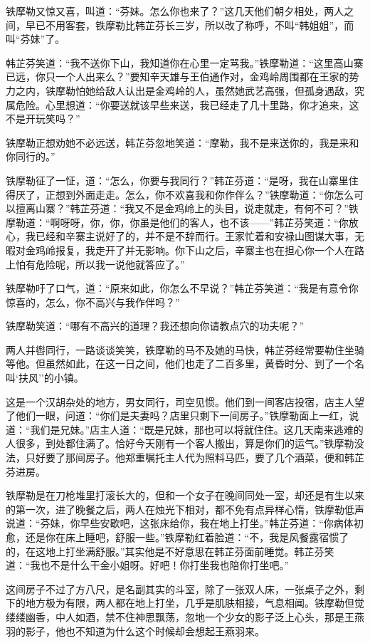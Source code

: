 \documentclass[12pt,oneside]{book}
\begin{document}
铁摩勒又惊又喜，叫道：``芬妹。怎么你也来了？''这几天他们朝夕相处，两人之间，早已不用客套，铁摩勒比韩芷芬长三岁，所以改了称呼，不叫``韩姐姐''，而叫``芬妹''了。

韩芷芬笑道：``我不送你下山，我知道你在心里一定骂我。''铁摩勒道：``这里高山寨已远，你只一个人出来么？''要知辛天雄与王伯通作对，金鸡岭周围都在王家的势力之内，铁摩勒怕她给敌人认出是金鸡岭的人，虽然她武艺高强，但孤身遇敌，究属危险。心里想道：``你要送就该早些来送，我已经走了几十里路，你才追来，这不是开玩笑吗？''

铁摩勒正想劝她不必远送，韩芷芬忽地笑道：``摩勒，我不是来送你的，我是来和你同行的。''

铁摩勒征了一怔，道：``怎么，你要与我同行？''韩芷芬道：``是呀，我在山寨里住得厌了，正想到外面走走。怎么，你不欢喜我和你作伴么？''铁摩勒道：``你怎么可以擅离山寨？''韩芷芬道：``我又不是金鸡岭上的头目，说走就走，有何不可？''铁摩勒道：``啊呀呀，你，你，你虽是他们的客人，也不该------''韩芷芬笑道：``你放心，我已经和辛寨主说好了的，并不是不辞而行。王家忙着和安禄山图谋大事，无暇对金鸡岭报复，我走开了并无影响。你下山之后，辛寨主也在担心你一个人在路上怕有危险呢，所以我一说他就答应了。''

铁摩勒吁了口气，道：``原来如此，你怎么不早说？''韩芷芬笑道：``我是有意令你惊喜的，怎么，你不高兴与我作伴吗？''

铁摩勒笑道：``哪有不高兴的道理？我还想向你请教点穴的功夫呢？''

两人并辔同行，一路谈谈笑笑，铁摩勒的马不及她的马快，韩芷芬经常要勒住坐骑等他。但虽然如此，在这一日之间，他们也走了二百多里，黄昏时分、到了一个名叫`扶风''的小镇。

这是一个汉胡杂处的地方，男女同行，司空见惯。他们到一间客店投宿，店主人望了他们一眼，问道：``你们是夫妻吗？店里只剩下一间房子。''铁摩勒面上一红，说道：``我们是兄妹。''店主人道：``既是兄妹，那也可以将就住住。这几天南来逃难的人很多，到处都住满了。恰好今天刚有一个客人搬出，算是你们的运气。''铁摩勒没法，只好要了那间房子。他郑重嘱托主人代为照料马匹，要了几个酒菜，便和韩芷芬进房。

铁摩勒是在刀枪堆里打滚长大的，但和一个女子在晚间同处一室，却还是有生以来的第一次，进了晚餐之后，两人在烛光下相对，都不免有点异样心惰，铁摩勒低声说道：``芬妹，你早些安歇吧，这张床给你，我在地上打坐。''韩芷芬道：``你病体初愈，还是你在床上睡吧，舒服一些。''铁摩勒红着脸道：``不，我是风餐露宿惯了的，在这地上打坐满舒服。''其实他是不好意思在韩芷芬面前睡觉。韩芷芬笑道：``我也不是什么干金小姐呀。好吧！你打坐我也陪你打坐吧。''

这间房子不过了方八尺，是名副其实的斗室，除了一张双人床，一张桌子之外，剩下的地方极为有限，两人都在地上打坐，几乎是肌肤相接，气息相闻。铁摩勒但觉缕缕幽香，中人如酒，禁不住神思飘荡，忽地一个少女的影子泛上心头，那是王燕羽的影子，他也不知道为什么这个时候却会想起王燕羽来。
\end{document}
